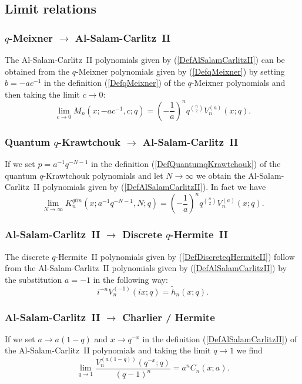 \documentclass[envcountchap,graybox]{svmono}
\newcounter{rom}
\begin{document}
\subsection*{Limit relations}

\subsubsection*{$q$-Meixner $\rightarrow$ Al-Salam-Carlitz~II}
The Al-Salam-Carlitz~II polynomials given by (\ref{DefAlSalamCarlitzII})
can be obtained from the $q$-Meixner polynomials given by (\ref{DefqMeixner})
by setting $b=-ac^{-1}$ in the definition (\ref{DefqMeixner}) of the
$q$-Meixner polynomials and then taking the limit $c\rightarrow 0$:
$$\lim_{c\rightarrow 0}M_n(x;-ac^{-1},c;q)=
\left(-\frac{1}{a}\right)^nq^{\binom{n}{2}}V_n^{(a)}(x;q).$$

\subsubsection*{Quantum $q$-Krawtchouk $\rightarrow$ Al-Salam-Carlitz~II}
If we set $p=a^{-1}q^{-N-1}$ in the definition (\ref{DefQuantumqKrawtchouk})
of the quantum $q$-Krawtchouk polynomials and let $N\rightarrow\infty$ we
obtain the Al-Salam-Carlitz~II polynomials given by
(\ref{DefAlSalamCarlitzII}). In fact we have
$$\lim_{N\rightarrow\infty}K_n^{qtm}(x;a^{-1}q^{-N-1},N;q)=
\left(-\frac{1}{a}\right)^nq^{\binom{n}{2}}V_n^{(a)}(x;q).$$

\subsubsection*{Al-Salam-Carlitz~II $\rightarrow$ Discrete $q$-Hermite~II}
The discrete $q$-Hermite~II polynomials given by
(\ref{DefDiscreteqHermiteII}) follow from the Al-Salam-Carlitz~II
polynomials given by (\ref{DefAlSalamCarlitzII}) by the substitution $a=-1$
in the following way:
\begin{equation}
i^{-n}V_n^{(-1)}(ix;q)={\tilde h}_n(x;q).
\end{equation}

\subsubsection*{Al-Salam-Carlitz~II $\rightarrow$ Charlier / Hermite}
If we set $a\rightarrow a(1-q)$ and $x\rightarrow q^{-x}$ in the
definition (\ref{DefAlSalamCarlitzII}) of the Al-Salam-Carlitz~II polynomials
and taking the limit $q\rightarrow 1$ we find
\begin{equation}
\lim_{q\rightarrow 1}\frac{V_n^{(a(1-q))}(q^{-x};q)}{(q-1)^n}=
a^nC_n(x;a).
\end{equation}
\end{document}
